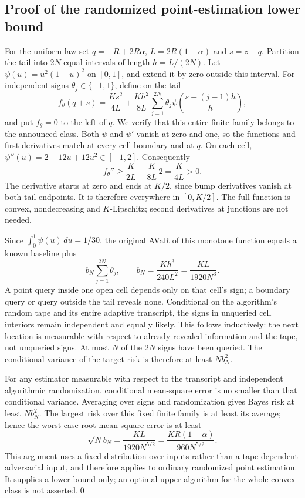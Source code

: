 \subsection{Proof of the randomized point-estimation lower bound}
For the uniform law set $q=-R+2R\alpha$, $L=2R(1-\alpha)$ and $s=z-q$. Partition the tail into $2N$ equal intervals of length $h=L/(2N)$. Let $\psi(u)=u^2(1-u)^2$ on $[0,1]$, and extend it by zero outside this interval. For independent signs $\theta_j\in\{-1,1\}$, define on the tail
\[
 f_\theta(q+s)=\frac{K s^2}{4L}
 +\frac{Kh^2}{8L}\sum_{j=1}^{2N}\theta_j
       \psi\left(\frac{s-(j-1)h}{h}\right),
\]
and put $f_\theta=0$ to the left of $q$. We verify that this entire finite family belongs to the announced class. Both $\psi$ and $\psi'$ vanish at zero and one, so the functions and first derivatives match at every cell boundary and at $q$. On each cell, $\psi''(u)=2-12u+12u^2\in[-1,2]$. Consequently
\[
 f_\theta''\ge\frac K{2L}-\frac K{8L}\,2=\frac K{4L}>0.
\]
The derivative starts at zero and ends at $K/2$, since bump derivatives vanish at both tail endpoints. It is therefore everywhere in $[0,K/2]$. The full function is convex, nondecreasing and $K$-Lipschitz; second derivatives at junctions are not needed.

Since $\int_0^1\psi(u)\,du=1/30$, the original AVaR of this monotone function equals a known baseline plus
\[
 b_N\sum_{j=1}^{2N}\theta_j,
 \qquad b_N=\frac{Kh^3}{240L^2}=\frac{KL}{1920N^3}.
\]
A point query inside one open cell depends only on that cell's sign; a boundary query or query outside the tail reveals none. Conditional on the algorithm's random tape and its entire adaptive transcript, the signs in unqueried cell interiors remain independent and equally likely. This follows inductively: the next location is measurable with respect to already revealed information and the tape, not unqueried signs. At most $N$ of the $2N$ signs have been queried. The conditional variance of the target risk is therefore at least $Nb_N^2$.

For any estimator measurable with respect to the transcript and independent algorithmic randomization, conditional mean-square error is no smaller than that conditional variance. Averaging over signs and randomization gives Bayes risk at least $Nb_N^2$. The largest risk over this fixed finite family is at least its average; hence the worst-case root mean-square error is at least
\[
 \sqrt N b_N=\frac{KL}{1920N^{5/2}}
             =\frac{KR(1-\alpha)}{960N^{5/2}}.
\]
This argument uses a fixed distribution over inputs rather than a tape-dependent adversarial input, and therefore applies to ordinary randomized point estimation. It supplies a lower bound only; an optimal upper algorithm for the whole convex class is not asserted.\qed

